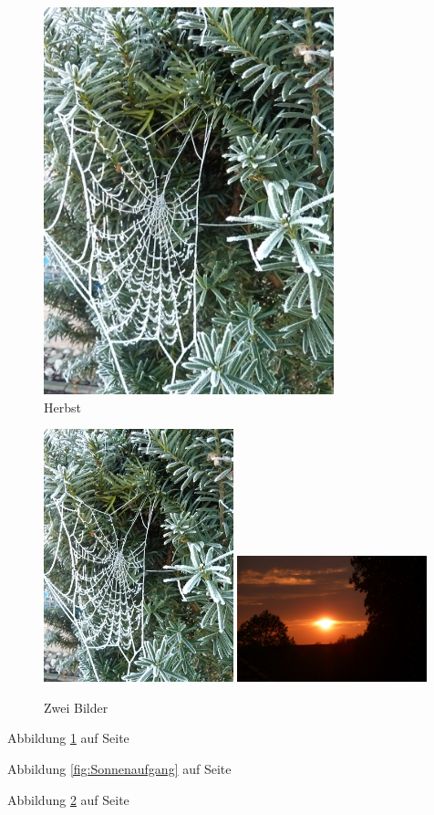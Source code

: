 \documentclass[ngerman,12pt,parskip=half]{scrreprt}
\begin{document}
	\begin{figure}
		\centering
		\includegraphics[width=0.75\textwidth]{Bilder/Herbst}
		\caption{Herbst}\label{fig:Herbst}
	\end{figure}

\blindtext[10]

\begin{figure}
	\centering
	{\includegraphics[width=0.49\textwidth]{Bilder/Herbst}}
	{\includegraphics[width=0.49\textwidth]{Bilder/Sonnenaufgang}}
	\caption{Zwei Bilder}\label{fig:Natur}
\end{figure}

Abbildung \ref{fig:Herbst} auf Seite \pageref{fig:Herbst}

Abbildung \ref{fig:Sonnenaufgang} auf Seite \pageref{fig:Sonnenaufgang}

Abbildung \ref{fig:Natur} auf Seite \pageref{fig:Natur}

\blindtext[2]

	
	
	
\end{document}

